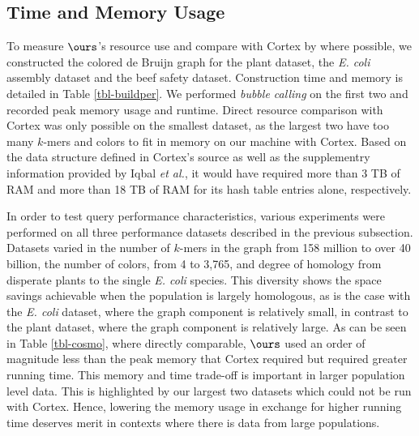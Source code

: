 \documentclass[doctor]{thesis}
\begin{document}
\subsection{Time and Memory Usage}

To measure $\ours$'s resource use and compare with {\sc Cortex} by \cite{ICTFM12} where possible, we constructed the colored de Bruijn graph for the plant dataset, the \emph{E. coli} assembly dataset and the beef safety dataset. Construction time and memory is detailed in Table \ref{tbl-buildper}. We performed {\em bubble calling} on the first two and recorded peak memory usage and runtime.  Direct resource comparison with {\sc Cortex} was only possible on the smallest  dataset, as the largest two have too many $k$-mers and colors to fit in memory on our machine with {\sc Cortex}.  Based on the data structure defined in {\sc Cortex}'s source as well as the supplementry information provided by Iqbal {\it et al.}, it would have required more than 3 TB of RAM and more than 18 TB of RAM for its hash table entries alone, respectively.



















In order to test query performance characteristics, various experiments were performed on all three performance datasets described in the previous subsection.  Datasets varied in the number of $k$-mers in the graph from 158 million to over 40 billion, the number of colors, from 4 to 3,765, and degree of homology from disperate plants to the single \emph{E. coli} species.  This diversity shows the space savings achievable when the population is largely homologous, as is the case with the \emph{E. coli} dataset, where the graph component is relatively small, in contrast to the plant dataset, where the graph component is relatively large. As can be seen in Table \ref{tbl-cosmo}, where directly comparable, $\ours$ used an order of magnitude less than the peak memory that {\sc Cortex}  required but required greater running time.  This memory and time trade-off is important in larger population level data.  This is highlighted by our largest two datasets which could not be run with {\sc Cortex}.
Hence, lowering the memory usage in exchange for higher running time deserves merit in contexts where there is data from large populations. 
 
\end{document}
